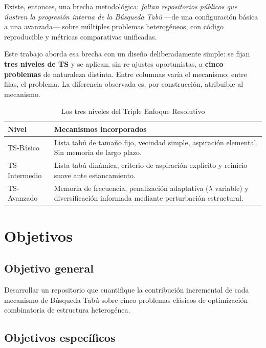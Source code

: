 Existe, entonces, una brecha metodológica: \emph{faltan repositorios públicos
que ilustren la progresión interna de la Búsqueda Tabú} —de una configuración
básica a una avanzada— sobre múltiples problemas heterogéneos, con código
reproducible y métricas comparativas unificadas.

Este trabajo aborda esa brecha con un diseño deliberadamente simple: se fijan
\textbf{tres niveles de TS} y se aplican, sin re-ajustes oportunistas, a
\textbf{cinco problemas} de naturaleza distinta. Entre columnas varía el
mecanismo; entre filas, el problema. La diferencia observada es, por
construcción, atribuible al mecanismo.

\begin{table}[H]
\centering
\caption{Los tres niveles del Triple Enfoque Resolutivo}
\label{tab:niveles}
\small
\begin{tabular}{lp{9cm}}
\toprule
\textbf{Nivel} & \textbf{Mecanismos incorporados} \\
\midrule
TS-Básico      & Lista tabú de tamaño fijo, vecindad simple, aspiración
                 elemental. Sin memoria de largo plazo. \\
TS-Intermedio  & Lista tabú dinámica, criterio de aspiración explícito y
                 reinicio suave ante estancamiento. \\
TS-Avanzado    & Memoria de frecuencia, penalización adaptativa
                 ($\lambda$ variable) y diversificación informada mediante
                 perturbación estructural. \\
\bottomrule
\end{tabular}
\end{table}

\section{Objetivos}
\label{sec:objetivos}

\subsection*{Objetivo general}

Desarrollar un repositorio que cuantifique la contribución incremental de
cada mecanismo de Búsqueda Tabú sobre cinco problemas clásicos de
optimización combinatoria de estructura heterogénea.

\subsection*{Objetivos específicos}

